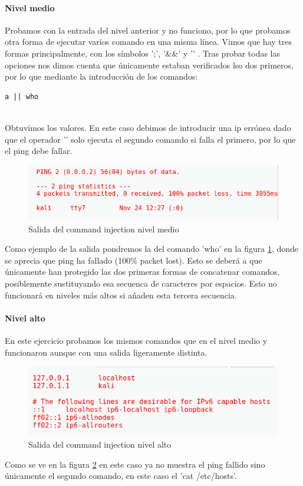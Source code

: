 \paragraph{Nivel medio} Probamos con la entrada del nivel anterior y no funciono, por lo 
que probamos otra forma de ejecutar varios comando en una misma línea. Vimos que hay tres formas
principalmente, con los símbolos ';', '\&\&' y '\textbar \textbar' \cite{multicommand}. 
Tras probar todas las opciones nos dimos cuenta que únicamente estaban verificados lso dos primeros,
por lo que mediante la introducción de los comandos: 
\begin{lstlisting}
a || who
 
\end{lstlisting}
Obtuvimos los valores. En este caso debimos de introducir una ip errónea dado que el operador
'\textbar \textbar' solo ejecuta el segundo comando si falla el primero, por lo que el ping debe fallar.
\begin{figure}[ht!]
    \centering
    \includegraphics[width=14cm]{img/cmdinjection/medium.png}
    \caption{Salida del command injection nivel medio }
    \label{fig:injOutputMedium}
\end{figure}
Como ejemplo de la salida pondremos la del comando 'who' en la figura \ref{fig:injOutputMedium}, donde se aprecia
que ping ha fallado (100\% packet lost). Esto se deberá a que únicamente han protegido las dos primeras formas 
de concatenar comandos, posiblemente sustituyando esa secuenca de caracteres por espacios. Esto no funcionará 
en niveles más altos si añaden esta tercera secuencia.
\paragraph{Nivel alto} En este ejercicio probamos los mismos comandos que en el nivel medio
y funcionaron aunque con una salida ligeramente distinta.

\begin{figure}[ht!]
    \centering
    \includegraphics[width=14cm]{img/cmdinjection/hard.png}
    \caption{Salida del command injection nivel alto}
    \label{fig:injOutputHard}
\end{figure}
Como se ve en la figura \ref{fig:injOutputHard} en este caso ya no muestra el ping fallido sino únicamente el 
segundo comando, en este caso el 'cat /etc/hosts'.
